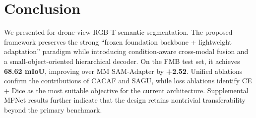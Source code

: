 \section{Conclusion}

We presented \method{} for drone-view RGB-T semantic segmentation. The proposed framework preserves the strong ``frozen foundation backbone + lightweight adaptation'' paradigm while introducing condition-aware cross-modal fusion and a small-object-oriented hierarchical decoder. On the FMB test set, it achieves \textbf{68.62 mIoU}, improving over MM SAM-Adapter by \textbf{+2.52}. Unified ablations confirm the contributions of CACAF and SAGU, while loss ablations identify CE + Dice as the most suitable objective for the current architecture. Supplemental MFNet results further indicate that the design retains nontrivial transferability beyond the primary benchmark.
